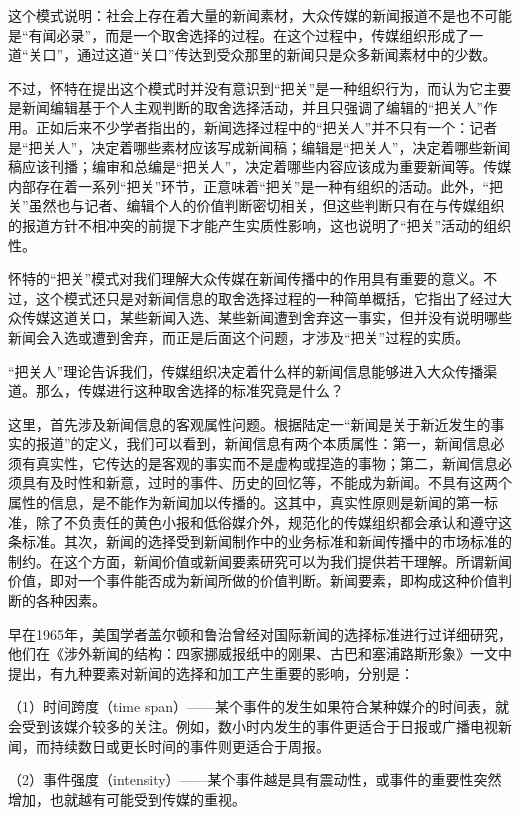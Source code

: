 \documentclass[UTF8,12pt]{ctexart}
\numberwithin{equation}{section} %
\numberwithin{figure}{section}
\numberwithin{table}{section}
\begin{document}
	这个模式说明：社会上存在着大量的新闻素材，大众传媒的新闻报道不是也不可能是“有闻必录”，而是一个取舍选择的过程。在这个过程中，传媒组织形成了一道“关口”，通过这道“关口”传达到受众那里的新闻只是众多新闻素材中的少数。
	
	不过，怀特在提出这个模式时并没有意识到“把关”是一种组织行为，而认为它主要是新闻编辑基于个人主观判断的取舍选择活动，并且只强调了编辑的“把关人”作用。正如后来不少学者指出的，新闻选择过程中的“把关人”并不只有一个：记者是“把关人”，决定着哪些素材应该写成新闻稿；编辑是“把关人”，决定着哪些新闻稿应该刊播；编审和总编是“把关人”，决定着哪些内容应该成为重要新闻等。传媒内部存在着一系列“把关”环节，正意味着“把关”是一种有组织的活动。此外，“把关”虽然也与记者、编辑个人的价值判断密切相关，但这些判断只有在与传媒组织的报道方针不相冲突的前提下才能产生实质性影响，这也说明了“把关”活动的组织性。
	
	怀特的“把关”模式对我们理解大众传媒在新闻传播中的作用具有重要的意义。不过，这个模式还只是对新闻信息的取舍选择过程的一种简单概括，它指出了经过大众传媒这道关口，某些新闻入选、某些新闻遭到舍弃这一事实，但并没有说明哪些新闻会入选或遭到舍弃，而正是后面这个问题，才涉及“把关”过程的实质。
	
	“把关人”理论告诉我们，传媒组织决定着什么样的新闻信息能够进入大众传播渠道。那么，传媒进行这种取舍选择的标准究竟是什么？
	
	这里，首先涉及新闻信息的客观属性问题。根据陆定一“新闻是关于新近发生的事实的报道”的定义，我们可以看到，新闻信息有两个本质属性：第一，新闻信息必须有真实性，它传达的是客观的事实而不是虚构或捏造的事物；第二，新闻信息必须具有及时性和新意，过时的事件、历史的回忆等，不能成为新闻。不具有这两个属性的信息，是不能作为新闻加以传播的。这其中，真实性原则是新闻的第一标准，除了不负责任的黄色小报和低俗媒介外，规范化的传媒组织都会承认和遵守这条标准。其次，新闻的选择受到新闻制作中的业务标准和新闻传播中的市场标准的制约。在这个方面，新闻价值或新闻要素研究可以为我们提供若干理解。所谓新闻价值，即对一个事件能否成为新闻所做的价值判断。新闻要素，即构成这种价值判断的各种因素。
	
	早在1965年，美国学者盖尔顿和鲁治曾经对国际新闻的选择标准进行过详细研究，他们在《涉外新闻的结构：四家挪威报纸中的刚果、古巴和塞浦路斯形象》一文中提出，有九种要素对新闻的选择和加工产生重要的影响，分别是：
	
	（1）时间跨度（time span）——某个事件的发生如果符合某种媒介的时间表，就会受到该媒介较多的关注。例如，数小时内发生的事件更适合于日报或广播电视新闻，而持续数日或更长时间的事件则更适合于周报。
	
	（2）事件强度（intensity）——某个事件越是具有震动性，或事件的重要性突然增加，也就越有可能受到传媒的重视。
	
\end{document}
